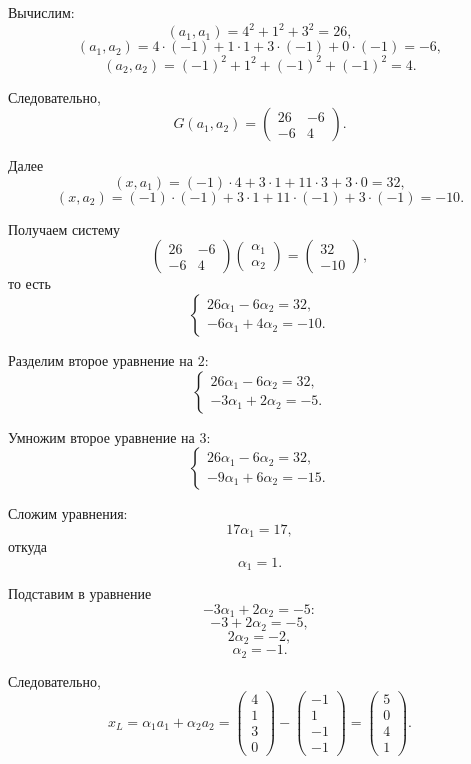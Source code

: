 Вычислим:
\[
(a_1,a_1)=4^2+1^2+3^2=26,
\]
\[
(a_1,a_2)=4\cdot(-1)+1\cdot1+3\cdot(-1)+0\cdot(-1)=-6,
\]
\[
(a_2,a_2)=(-1)^2+1^2+(-1)^2+(-1)^2=4.
\]

Следовательно,
\[
G(a_1,a_2)=
\begin{pmatrix}
26 & -6\\
-6 & 4
\end{pmatrix}.
\]

Далее
\[
(x,a_1)=(-1)\cdot4+3\cdot1+11\cdot3+3\cdot0=32,
\]
\[
(x,a_2)=(-1)\cdot(-1)+3\cdot1+11\cdot(-1)+3\cdot(-1)=-10.
\]

Получаем систему
\[
\begin{pmatrix}
26 & -6\\
-6 & 4
\end{pmatrix}
\begin{pmatrix}
\alpha_1\\
\alpha_2
\end{pmatrix}
=
\begin{pmatrix}
32\\
-10
\end{pmatrix},
\]
то есть
\[
\begin{cases}
26\alpha_1-6\alpha_2=32,\\
-6\alpha_1+4\alpha_2=-10.
\end{cases}
\]

Разделим второе уравнение на $2$:
\[
\begin{cases}
26\alpha_1-6\alpha_2=32,\\
-3\alpha_1+2\alpha_2=-5.
\end{cases}
\]

Умножим второе уравнение на $3$:
\[
\begin{cases}
26\alpha_1-6\alpha_2=32,\\
-9\alpha_1+6\alpha_2=-15.
\end{cases}
\]

Сложим уравнения:
\[
17\alpha_1=17,
\]
откуда
\[
\alpha_1=1.
\]

Подставим в уравнение
\[
-3\alpha_1+2\alpha_2=-5:
\]
\[
-3+2\alpha_2=-5,
\]
\[
2\alpha_2=-2,
\]
\[
\alpha_2=-1.
\]

Следовательно,
\[
x_L=\alpha_1a_1+\alpha_2a_2=
\begin{pmatrix}
4\\
1\\
3\\
0
\end{pmatrix}
-
\begin{pmatrix}
-1\\
1\\
-1\\
-1
\end{pmatrix}
=
\begin{pmatrix}
5\\
0\\
4\\
1
\end{pmatrix}.
\]


